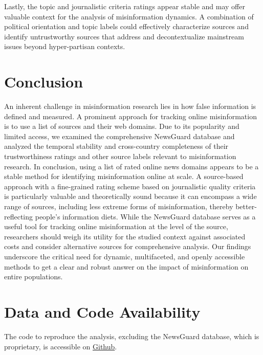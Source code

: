\documentclass{article}
\begin{document}
Lastly, the topic and journalistic criteria ratings appear stable and may offer valuable context for the analysis of misinformation dynamics.
A combination of political orientation and topic labels could effectively characterize sources and identify untrustworthy sources that address and decontextualize mainstream issues beyond hyper-partisan contexts.

\section{Conclusion}
An inherent challenge in misinformation research lies in how false information is defined and measured. 
A prominent approach for tracking online misinformation is to use a list of sources and their web domains. 
Due to its popularity and limited access, we examined the comprehensive NewsGuard database and analyzed the temporal stability and cross-country completeness of their trustworthiness ratings and other source labels relevant to misinformation research. 
In conclusion, using a list of rated online news domains appears to be a stable method for identifying misinformation online at scale.
A source-based approach with a fine-grained rating scheme based on journalistic quality criteria is particularly valuable and theoretically sound because it can encompass a wide range of sources, including less extreme forms of misinformation, thereby better-reflecting people's information diets. 
While the NewsGuard database serves as a useful tool for tracking online misinformation at the level of the source, researchers should weigh its utility for the studied context against associated costs and consider alternative sources \citep[e.g.,][]{linHighLevelCorrespondence2023a} for comprehensive analysis. 
Our findings underscore the critical need for dynamic, multifaceted, and openly accessible methods to get a clear and robust answer on the impact of misinformation on entire populations.

\section{Data and Code Availability}
The code to reproduce the analysis, excluding the NewsGuard database, which is proprietary, is accessible on \href{https://github.com/julaluehring/newsguard-review-analysis}{Github}.


\end{document}
